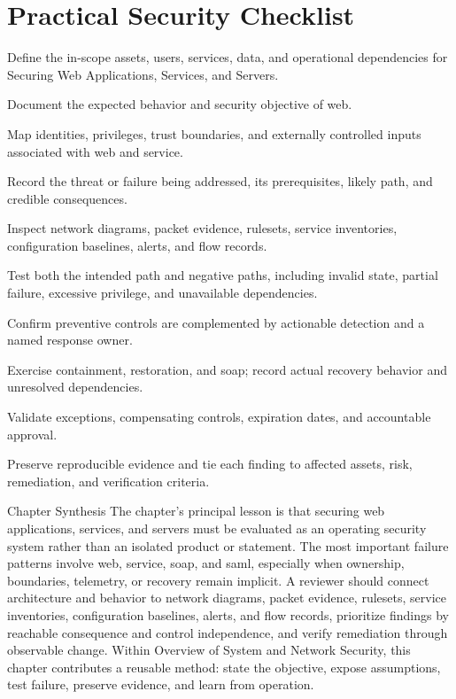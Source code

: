 \documentclass[11pt,letterpaper]{article}
\begin{document}
\section*{Practical Security Checklist}
\begin{CornellChecklist}
\item Define the in-scope assets, users, services, data, and operational dependencies for Securing Web Applications, Services, and Servers.
\item Document the expected behavior and security objective of web.
\item Map identities, privileges, trust boundaries, and externally controlled inputs associated with web and service.
\item Record the threat or failure being addressed, its prerequisites, likely path, and credible consequences.
\item Inspect network diagrams, packet evidence, rulesets, service inventories, configuration baselines, alerts, and flow records.
\item Test both the intended path and negative paths, including invalid state, partial failure, excessive privilege, and unavailable dependencies.
\item Confirm preventive controls are complemented by actionable detection and a named response owner.
\item Exercise containment, restoration, and soap; record actual recovery behavior and unresolved dependencies.
\item Validate exceptions, compensating controls, expiration dates, and accountable approval.
\item Preserve reproducible evidence and tie each finding to affected assets, risk, remediation, and verification criteria.
\end{CornellChecklist}
\begin{CornellSummaryBox}{Chapter Synthesis}
The chapter's principal lesson is that securing web applications, services, and servers must be evaluated as an operating security system rather than an isolated product or statement. The most important failure patterns involve web, service, soap, and saml, especially when ownership, boundaries, telemetry, or recovery remain implicit. A reviewer should connect architecture and behavior to network diagrams, packet evidence, rulesets, service inventories, configuration baselines, alerts, and flow records, prioritize findings by reachable consequence and control independence, and verify remediation through observable change. Within Overview of System and Network Security, this chapter contributes a reusable method: state the objective, expose assumptions, test failure, preserve evidence, and learn from operation.
\end{CornellSummaryBox}
\end{document}
